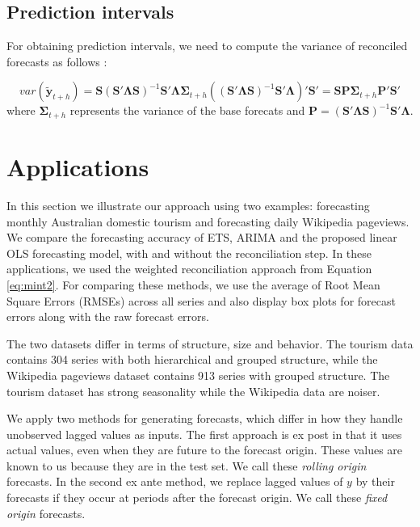 \documentclass[11pt,a4paper,]{article}
\begin{document}
\hypertarget{prediction-intervals}{%
\subsection{Prediction intervals}\label{prediction-intervals}}

For obtaining prediction intervals, we need to compute the variance of
reconciled forecasts as follows \autocite{mint2018}:

\begin{equation}\label{eq:variance}
    var(\tilde{\bm{y}}_{t+h}) = \bm{S}(\bm{S}'\bm{\Lambda}\bm{S})^{-1}\bm{S}'\bm{\Lambda}{\bm{\Sigma}_{t+h}} ((\bm{S}'\bm{\Lambda}\bm{S})^{-1}\bm{S}'\bm{\Lambda})'\bm{S}'
                         = \bm{S}\bm{P}{\bm{\Sigma}_{t+h}} \bm{P}'\bm{S}'
\end{equation} where \({\bm{\Sigma}_{t+h}}\) represents the variance of
the base forecats and
\({\bm{P}} = (\bm{S}'\bm{\Lambda}\bm{S})^{-1}\bm{S}'\bm{\Lambda}\).

\hypertarget{applications}{%
\section{Applications}\label{applications}}

In this section we illustrate our approach using two examples:
forecasting monthly Australian domestic tourism and forecasting daily
Wikipedia pageviews. We compare the forecasting accuracy of ETS, ARIMA
and the proposed linear OLS forecasting model, with and without the
reconciliation step. In these applications, we used the weighted
reconciliation approach from Equation \eqref{eq:mint2}. For comparing
these methods, we use the average of Root Mean Square Errors (RMSEs)
across all series and also display box plots for forecast errors along
with the raw forecast errors.

The two datasets differ in terms of structure, size and behavior. The
tourism data contains 304 series with both hierarchical and grouped
structure, while the Wikipedia pageviews dataset contains 913 series
with grouped structure. The tourism dataset has strong seasonality while
the Wikipedia data are noiser.

We apply two methods for generating forecasts, which differ in how they
handle unobserved lagged values as inputs. The first approach is ex post
in that it uses actual values, even when they are future to the forecast
origin. These values are known to us because they are in the test set.
We call these \emph{rolling origin} forecasts. In the second ex ante
method, we replace lagged values of \(y\) by their forecasts if they
occur at periods after the forecast origin. We call these \emph{fixed
origin} forecasts.
\end{document}
